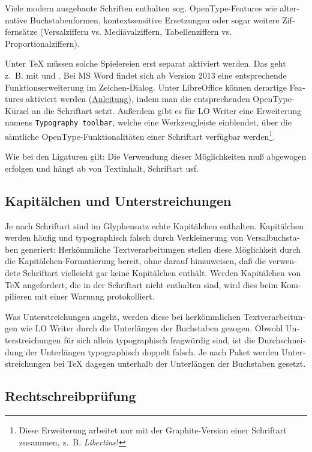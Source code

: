 \documentclass[11pt,a4paper,ngerman,french,DIV=8]{scrartcl}
\begin{document}
\begin{otherlanguage}{ngerman}
Viele modern ausgebaute Schriften enthalten sog. OpenType-Features wie alternative Buchstabenformen, kontextsensitive Ersetzungen oder sogar weitere Ziffernsätze (Versalziffern vs. Mediävalziffern, Tabellenziffern vs. Proportionalziffern).

Unter \TeX{} müssen solche Spielereien erst separat aktiviert werden. Das geht z.~B. mit \XeTeX{} und \LuaTeX{}. Bei MS Word findet sich ab Version 2013 eine entsprechende Funktionserweiterung im Zeichen-Dialog. Unter LibreOffice können derartige Features aktiviert werden (\href{http://buchlayout.info/die-sensation-ist-perfekt-der-libreoffice-writer-unterstuetzt-ab-sofort-opentype-features/}{Anleitung}), indem man die entsprechenden OpenType-Kürzel an die Schriftart setzt. Außerdem gibt es für LO Writer eine Erweiterung namens \texttt{Typography toolbar}, welche eine Werkzeugleiste einblendet, über die sämtliche OpenType-Funktionalitäten einer Schriftart verfügbar werden\footnote{Diese Erweiterung arbeitet nur mit der Graphite-Version einer Schriftart zusammen, z.~B. \emph{Libertine}!}.

Wie bei den Ligaturen gilt: Die Verwendung dieser Möglichkeiten muß abgewogen erfolgen und hängt ab von Textinhalt, Schriftart usf.

\subsection{Kapitälchen und Unterstreichungen}

Je nach Schriftart sind im Glyphensatz echte Kapitälchen enthalten. Kapitälchen werden häufig und typographisch falsch durch Verkleinerung von Versalbuchstaben generiert: Herkömmliche Textverarbeitungen stellen diese Möglichkeit durch die Kapitälchen-Formatierung bereit, ohne darauf hinzuweisen, daß die verwendete Schriftart vielleicht gar keine Kapitälchen enthält. Werden Kapitälchen von \TeX{} angefordert, die in der Schriftart nicht enthalten sind, wird dies beim Kompilieren mit einer Warnung protokolliert.

Was Unterstreichungen angeht, werden diese bei herkömmlichen Textverarbeitungen wie LO Writer durch die Unterlängen der Buchstaben gezogen. Obwohl Unterstreichungen für sich allein typographisch fragwürdig sind, ist die Durchschneidung der Unterlängen typographisch doppelt falsch. Je nach Paket werden Unterstreichungen bei \TeX{} dagegen unterhalb der Unterlängen der Buchstaben gesetzt.

\subsection{Rechtschreibprüfung}


\end{otherlanguage}
\end{document}
